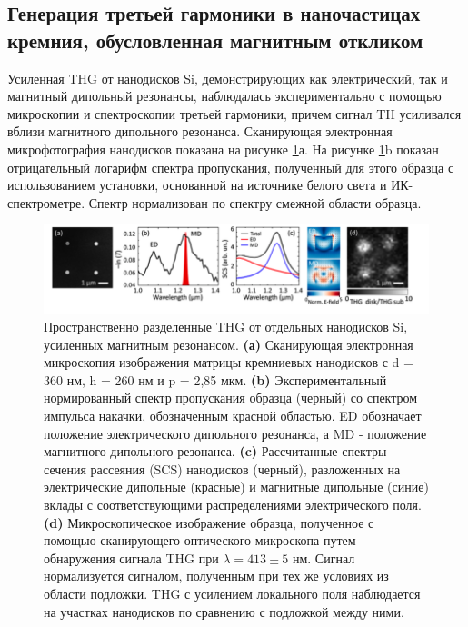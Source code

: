 \subsection*{Генерация третьей гармоники в наночастицах кремния, обусловленная магнитным откликом}
\hspace*{2mm}
Усиленная THG от нанодисков Si, демонстрирующих как электрический, так и магнитный дипольный резонансы, наблюдалась экспериментально \cite{shcherbakov2014enhanced} с помощью микроскопии и спектроскопии третьей гармоники, причем сигнал TH усиливался вблизи магнитного дипольного резонанса. Сканирующая электронная микрофотография нанодисков показана на рисунке \ref{nonliner:nanodisks1}а. На рисунке \ref{nonliner:nanodisks1}b показан отрицательный логарифм спектра пропускания, полученный для этого образца с использованием установки, основанной на источнике белого света и ИК-спектрометре. Спектр нормализован по спектру смежной области образца.
\begin{figure}[h!]
	\centering
	\includegraphics[width=1\linewidth]{images/fig4.png}
	\caption{Пространственно разделенные THG от отдельных нанодисков Si, усиленных магнитным резонансом. \textbf{(а)} Сканирующая электронная микроскопия изображения матрицы кремниевых нанодисков с d = 360 нм, h = 260 нм и p = 2,85 мкм. \textbf{(b)} Экспериментальный нормированный спектр пропускания образца (черный) со спектром импульса накачки, обозначенным красной областью. ED обозначает положение электрического дипольного резонанса, а MD - положение магнитного дипольного резонанса. \textbf{(c) }Рассчитанные спектры сечения рассеяния (SCS) нанодисков (черный), разложенных на электрические дипольные (красные) и магнитные дипольные (синие) вклады с соответствующими распределениями электрического поля. \textbf{(d)} Микроскопическое изображение образца, полученное с помощью сканирующего оптического микроскопа путем обнаружения сигнала THG при $\lambda = 413 \pm 5$ нм. Сигнал нормализуется сигналом, полученным при тех же условиях из области подложки. THG с усилением локального поля наблюдается на участках нанодисков по сравнению с подложкой между ними.}
	\label{nonliner:nanodisks1}
\end{figure}
\hspace*{2mm}

